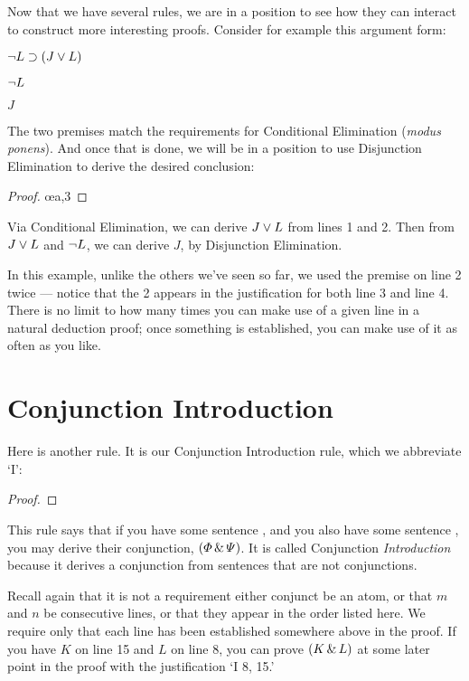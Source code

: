 Now that we have several rules, we are in a position to see how they can interact to construct more interesting proofs. Consider for example this argument form:

\begin{earg}
\item[] $\neg L \supset (J \vee L)$
\item[] $\neg L$
\item[\therefore] $J$
\end{earg}

The two premises match the requirements for Conditional Elimination (\emph{modus ponens}). And once that is done, we will be in a position to use Disjunction Elimination to derive the desired conclusion:

\begin{proof}
	  
	 
	 \oe{a,3}
\end{proof}

Via Conditional Elimination, we can derive $J \vee L$ from lines 1 and 2. Then from $J \vee L$ and $\neg L$, we can derive $J$, by Disjunction Elimination.

In this example, unlike the others we've seen so far, we used the premise on line 2 twice --- notice that the 2 appears in the justification for both line 3 and line 4. There is no limit to how many times you can make use of a given line in a natural deduction proof; once something is established, you can make use of it as often as you like.

\section{Conjunction Introduction}

Here is another rule. It is our Conjunction Introduction rule, which we abbreviate `{\eand}I':

\begin{proof}
	\metaA{}
	\metaB{}
	 
\end{proof}

This rule says that if you have some sentence \metaA{}, and you also have some sentence \metaB{}, you may derive their conjunction, $(\varPhi{} \,\&\, \varPsi{})$. It is called Conjunction \emph{Introduction} because it derives a conjunction from sentences that are not conjunctions.

Recall again that it is not a requirement either conjunct be an atom, or that $m$ and $n$ be consecutive lines, or that they appear in the order listed here. We require only that each line has been established somewhere above in the proof. If you have $K$ on line 15 and $L$ on line 8, you can prove $(K\,\&\, L)$ at some later point in the proof with the justification `{\eand}I 8, 15.'

